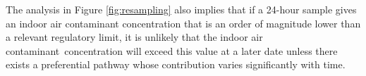 The analysis in Figure \ref{fig:resampling} also implies that if a 24-hour sample gives an indoor air contaminant concentration that is an order of magnitude lower than a relevant regulatory limit, it is unlikely that the indoor air contaminant concentration will exceed this value at a later date unless there exists a preferential pathway whose contribution varies significantly with time.\par
